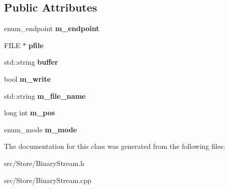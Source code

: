 \subsection*{Public Attributes}
\begin{DoxyCompactItemize}
\item 
\hypertarget{classBinaryStream_a056258a29881cd6d53b271ac9d77fe7c}{enum\-\_\-endpoint {\bfseries m\-\_\-endpoint}}\label{classBinaryStream_a056258a29881cd6d53b271ac9d77fe7c}

\item 
\hypertarget{classBinaryStream_ac680a2ac9fc45abf382dfd68edfa0630}{F\-I\-L\-E $\ast$ {\bfseries pfile}}\label{classBinaryStream_ac680a2ac9fc45abf382dfd68edfa0630}

\item 
\hypertarget{classBinaryStream_a9b47384e855aaac8fa9d55f49e8fbe95}{std\-::string {\bfseries buffer}}\label{classBinaryStream_a9b47384e855aaac8fa9d55f49e8fbe95}

\item 
\hypertarget{classBinaryStream_a71ae465f16d2d66c559abab48e7ab1c6}{bool {\bfseries m\-\_\-write}}\label{classBinaryStream_a71ae465f16d2d66c559abab48e7ab1c6}

\item 
\hypertarget{classBinaryStream_a791a88624d85fd9f48ba4ee85948f9e8}{std\-::string {\bfseries m\-\_\-file\-\_\-name}}\label{classBinaryStream_a791a88624d85fd9f48ba4ee85948f9e8}

\item 
\hypertarget{classBinaryStream_a98516726606b927c4178c0b449781695}{long int {\bfseries m\-\_\-pos}}\label{classBinaryStream_a98516726606b927c4178c0b449781695}

\item 
\hypertarget{classBinaryStream_a1f5e15f43725da5773b20169b07c689f}{enum\-\_\-mode {\bfseries m\-\_\-mode}}\label{classBinaryStream_a1f5e15f43725da5773b20169b07c689f}

\end{DoxyCompactItemize}


The documentation for this class was generated from the following files\-:\begin{DoxyCompactItemize}
\item 
src/\-Store/Binary\-Stream.\-h\item 
src/\-Store/Binary\-Stream.\-cpp\end{DoxyCompactItemize}
